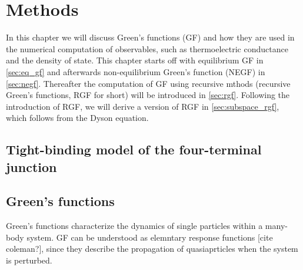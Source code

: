\chapter{Methods}
\label{ch:methods}
In this chapter we will discuss Green's functions (GF) and how they are used in the numerical computation of observables, such as thermoelectric conductance and the density of state. This chapter starts off with equilibrium GF in \ref{sec:eq_gf} and afterwards non-equilibrium Green's function (NEGF) in \ref{sec:negf}. Thereafter the computation of GF using recursive mthods (recursive Green's functions, RGF for short) will be introduced in \ref{sec:rgf}. Following the introduction of RGF, we will derive a version of RGF in \ref{sec:subspace_rgf}, which follows from the Dyson equation. 

\section{Tight-binding model of the four-terminal junction}
\label{sec:model}

\section{Green's functions}
\label{sec:gf}
Green's functions characterize the dynamics of single particles within a many-body system. GF can be understood as elemntary response functions [cite coleman?], since they describe the propagation of quasiaprticles when the system is perturbed.
